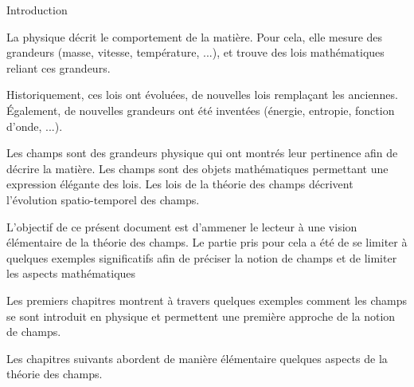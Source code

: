 \begin{center}
\Large
Introduction
\normalsize
\end{center}
\vspace{3cm}

La physique décrit le comportement de la matière. Pour cela, elle mesure des grandeurs (masse, vitesse, température, ...), et trouve des lois mathématiques reliant ces grandeurs.

Historiquement, ces lois ont évoluées, de nouvelles lois remplaçant les anciennes. Également, de nouvelles grandeurs ont été inventées (énergie, entropie, fonction d'onde, ...).

Les champs sont des grandeurs physique qui ont montrés leur pertinence afin de décrire la matière. Les champs sont des objets mathématiques permettant une expression élégante des lois. Les lois de la théorie des champs décrivent l'évolution spatio-temporel des champs.

\vspace{3cm}

L'objectif de ce présent document est d'ammener le lecteur à une vision élémentaire de la théorie des champs. Le partie pris pour cela a été de se limiter à quelques exemples significatifs afin de préciser la notion de champs et de limiter les aspects mathématiques

Les premiers chapitres montrent à travers quelques exemples comment les champs se sont introduit en physique et permettent une première approche de la notion de champs.

Les chapitres suivants abordent de manière élémentaire quelques aspects de la théorie des champs.


